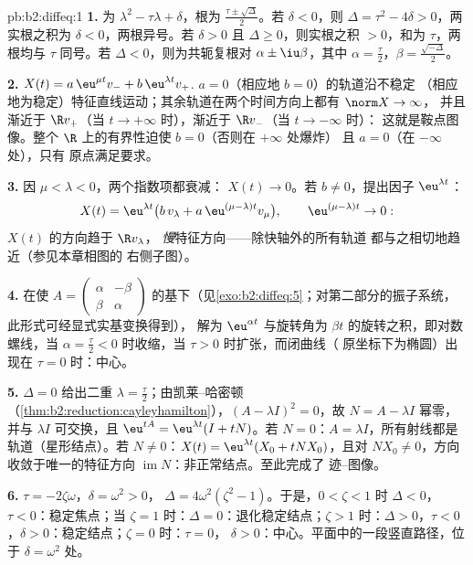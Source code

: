\begin{solution}{pb:b2:diffeq:1}
\textbf{1.} 为 $\lambda^2 -
\tau\lambda + \delta$，根为
$\frac{\tau\pm\sqrt\Delta}{2}$。若 $\delta < 0$，则 $\Delta =
\tau^2 - 4\delta > 0$，两实根之积为
$\delta < 0$，两根异号。若 $\delta > 0$ 且 $\Delta \geq
0$，则实根之积 $> 0$，和为 $\tau$，两根均与
$\tau$ 同号。若 $\Delta < 0$，则为共轭复根对 $\alpha \pm
\iu\beta$，其中 $\alpha = \frac\tau2$，$\beta =
\frac{\sqrt{-\Delta}}2$。

\textbf{2.} $X(t) = a\,\eu^{\mu t}v_- + b\,\eu^{\lambda t}v_+$.
$a = 0$（相应地 $b = 0$）的轨道沿不稳定
（相应地为稳定）特征直线运动；其余轨道在两个时间方向上都有 $\norm X \to \infty$，
并且渐近于 $\R v_+$（当 $t \to
+\infty$ 时），渐近于 $\R v_-$（当 $t \to -\infty$ 时）：
这就是鞍点图像。整个 $\R$ 上的有界性迫使 $b = 0$（否则在 $+\infty$ 处爆炸）
且 $a = 0$（在 $-\infty$ 处），只有
原点满足要求。

\textbf{3.} 因 $\mu < \lambda < 0$，两个指数项都衰减：
$X(t) \to 0$。若 $b \neq 0$，提出因子 $\eu^{\lambda t}$：
\[
X(t) = \eu^{\lambda t}\bigl(b\,v_\lambda + a\,\eu^{(\mu -
\lambda)t}v_\mu\bigr),
\qquad \eu^{(\mu-\lambda)t} \to 0 :
\]
$X(t)$ 的方向趋于 $\R v_\lambda$，
\emph{慢}特征方向——除快轴外的所有轨道
都与之相切地趋近（参见本章相图的
右侧子图）。

\textbf{4.} 在使 $A = \begin{pmatrix} \alpha &
-\beta\\ \beta & \alpha\end{pmatrix}$
的基下（见\cref{exo:b2:diffeq:5}；对第二部分的振子系统，
此形式可经显式实基变换得到），
解为 $\eu^{\alpha t}$ 与旋转角为 $\beta
t$ 的旋转之积，即对数螺线，当 $\alpha = \frac\tau2
< 0$ 时收缩，当 $\tau > 0$ 时扩张，而闭曲线（
原坐标下为椭圆）出现在 $\tau = 0$ 时：中心。

\textbf{5.} $\Delta = 0$ 给出二重 $\lambda =
\frac\tau2$；由凯莱–哈密顿
（\cref{thm:b2:reduction:cayleyhamilton}），$(A - \lambda I)^2 =
0$，故 $N = A - \lambda I$ 幂零，并与
$\lambda I$ 可交换，且 $\eu^{tA} = \eu^{\lambda t}(I + tN)$。若 $N =
0$：$A = \lambda I$，所有射线都是轨道（星形结点）。若 $N
\neq 0$：$X(t) = \eu^{\lambda t}(X_0 + tNX_0)$，且对 $NX_0
\neq 0$，方向收敛于唯一的特征方向
$\operatorname{im}N$：非正常结点。至此完成了
迹–图像。

\textbf{6.} $\tau = -2\zeta\omega$，$\delta = \omega^2 > 0$，
$\Delta = 4\omega^2(\zeta^2 - 1)$。于是，$0 < \zeta < 1$ 时
$\Delta < 0$，$\tau < 0$：稳定焦点；当 $\zeta = 1$ 时：$\Delta =
0$：退化稳定结点；$\zeta > 1$ 时：$\Delta > 0$，$\tau <
0$，$\delta > 0$：稳定结点；$\zeta = 0$ 时：$\tau = 0$，
$\delta > 0$：中心。平面中的一段竖直路径，位于
$\delta = \omega^2$ 处。


\end{solution}

